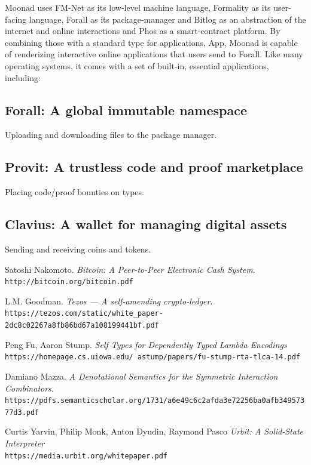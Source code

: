 \documentclass{article}
\theoremstyle{definition}
\theoremstyle{theorem}
\begin{document}
Moonad uses FM-Net as its low-level machine language, Formality as its
user-facing language, Forall as its package-manager and Bitlog as an
abstraction of the internet and online interactions and Phos as a smart-contract
platform. By combining those with a standard type for applications, App, Moonad
is capable of renderizing interactive online applications that users send to
Forall. Like many operating systems, it comes with a set of built-in, essential
applications, including:

\subsection{Forall: A global immutable namespace}
Uploading and downloading files to the package manager.
\subsection{Provit: A trustless code and proof marketplace}
Placing code/proof bounties on types.

\subsection{Clavius: A wallet for managing digital assets}
Sending and receiving coins and tokens.

\begin{thebibliography}{9}
Satoshi Nakomoto. \textit{Bitcoin: A Peer-to-Peer Electronic Cash System}.
\\\texttt{http://bitcoin.org/bitcoin.pdf}

L.M. Goodman. \textit{Tezos --- A self-amending crypto-ledger}.
\\\texttt{https://tezos.com/static/white\_paper-2dc8c02267a8fb86bd67a108199441bf.pdf}

Peng Fu, Aaron Stump. \textit{Self Types for Dependently Typed Lambda Encodings}
\\\texttt{https://homepage.cs.uiowa.edu/~astump/papers/fu-stump-rta-tlca-14.pdf}

Damiano Mazza. \textit{A Denotational Semantics for the Symmetric Interaction
Combinators}.
\\\texttt{https://pdfs.semanticscholar.org/1731/a6e49c6c2afda3e72256ba0afb34957377d3.pdf}

Curtis Yarvin, Philip Monk, Anton Dyudin, Raymond Pasco \textit{Urbit: A Solid-State Interpreter}
\\\texttt{https://media.urbit.org/whitepaper.pdf}
\end{thebibliography}
\end{document}
